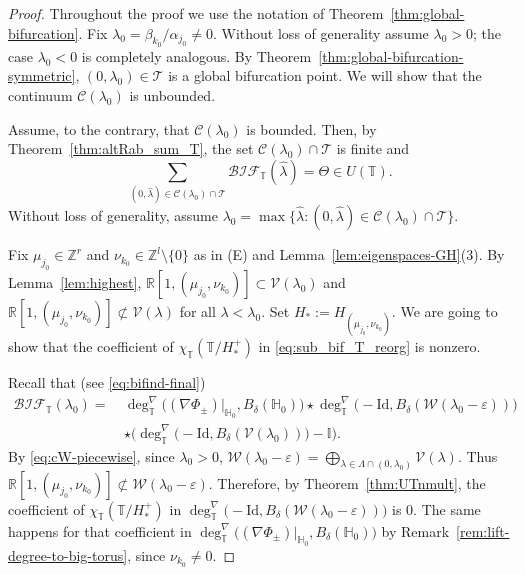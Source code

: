 \documentclass[reqno,twoside,12pt]{amsart}
\newcommand{\bH}{\mathbb{H}}
\newcommand{\bI}{\mathbb{I}}
\newcommand{\bR}{\mathbb{R}}
\newcommand{\bT}{\mathbb{T}}
\newcommand{\bZ}{\mathbb{Z}}
\newcommand{\cT}{\mathcal{T}}
\newcommand{\cV}{\mathcal{V}}
\newcommand{\cW}{\mathcal{W}}
\numberwithin{equation}{section} \errorcontextlines=0
\newcommand{\bif}{\mathcal{BIF}}
\begin{document}
\begin{proof}
Throughout the proof we use the notation of Theorem~\ref{thm:global-bifurcation}.
Fix $\lambda_{0}=\beta_{k_0}/\alpha_{j_0}\neq 0$. Without loss of generality assume $\lambda_0>0$; the case $\lambda_0<0$ is completely analogous. By Theorem~\ref{thm:global-bifurcation-symmetric}, $(0,\lambda_0)\in\cT$ is a global bifurcation point. We will show that the continuum $\mathcal{C}(\lambda_0)$ is unbounded.

Assume, to the contrary, that $\mathcal{C}(\lambda_0)$ is bounded. Then, by Theorem~\ref{thm:altRab_sum_T}, the set $\mathcal{C}(\lambda_0)\cap \mathcal{T}$ is finite and
\begin{equation}\label{eq:sub_bif_T_reorg}
\sum_{(0,\widehat{\lambda})\in \mathcal{C}(\lambda_0)\cap \mathcal{T}}
\bif_{\bT}(\widehat{\lambda})=\Theta\in U(\bT).
\end{equation}
Without loss of generality, assume $\lambda_0=\max\{\widehat{\lambda}:(0,\widehat{\lambda})\in \mathcal{C}(\lambda_0)\cap \mathcal{T}\}$.

Fix $\mu_{j_0}\in\bZ^r$ and $\nu_{k_0}\in\bZ^l\setminus \{0\}$ as in (E) and Lemma~\ref{lem:eigenspaces-GH}(3).
By Lemma~\ref{lem:highest}, $\bR[1,(\mu_{j_0},\nu_{k_0})]\subset \cV(\lambda_0)$ and $\bR[1,(\mu_{j_0},\nu_{k_0})]\not\subset \cV(\lambda)$ for all $\lambda<\lambda_0$.
Set $H_{*}:=H_{(\mu_{j_0},\nu_{k_0})}$.
We are going to show that the coefficient of $\chi_{\bT}(\bT/H_{*}^{+})$ in \eqref{eq:sub_bif_T_reorg} is nonzero.

Recall that (see \eqref{eq:bifind-final})
\begin{equation*}
\begin{aligned}
\bif_{\bT}(\lambda_{0})=\ &
\deg^{\nabla}_{\bT}\bigl((\nabla\Phi_{\pm})|_{\bH_0},B_{\delta}(\bH_0)\bigr)\star
\deg^{\nabla}_{\bT}\bigl(-\mathrm{Id},B_{\delta}(\cW(\lambda_{0}-\varepsilon))\bigr)
\\
&\star\bigl(\deg^{\nabla}_{\bT}\bigl(-\mathrm{Id},B_{\delta}(\cV(\lambda_{0}))\bigr)-\bI\bigr).
\end{aligned}
\end{equation*}
By \eqref{eq:cW-piecewise}, since $\lambda_0>0$,
$\cW(\lambda_0-\varepsilon)=\bigoplus_{\lambda\in \Lambda\cap(0,\lambda_{0})} \cV(\lambda).$
Thus $\bR[1,(\mu_{j_0},\nu_{k_0})]\not\subset \cW(\lambda_0-\varepsilon)$. Therefore, by Theorem~\ref{thm:UTnmult}, the coefficient of $\chi_{\bT}(\bT/H_{*}^{+})$ in $\deg^{\nabla}_{\bT}\bigl(-\mathrm{Id},B_{\delta}(\cW(\lambda_{0}-\varepsilon))\bigr)$ is $0$. The same happens for that coefficient in $\deg^{\nabla}_{\bT}\bigl((\nabla\Phi_{\pm})|_{\bH_0},B_{\delta}(\bH_0)\bigr)$ by Remark~\ref{rem:lift-degree-to-big-torus}, since $\nu_{k_0}\neq 0$.


\end{proof}
\end{document}

